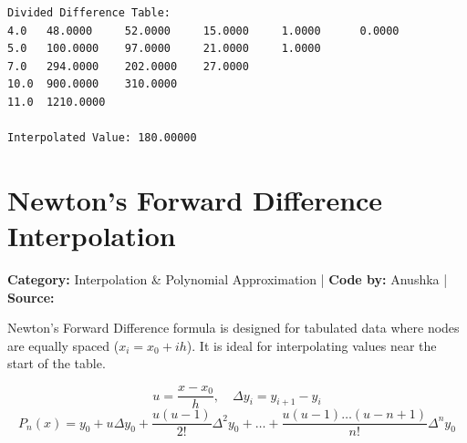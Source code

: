 \documentclass[10pt,a4paper]{report}
\begin{document}
\begin{tcolorbox}[colback=termbg,colframe=primary,title=\textbf{Program Execution Output \& Convergence Table},boxrule=1pt,arc=2mm]
\begin{lstlisting}[style=terminal_output]
Divided Difference Table:
4.0   48.0000     52.0000     15.0000     1.0000      0.0000      
5.0   100.0000    97.0000     21.0000     1.0000      
7.0   294.0000    202.0000    27.0000     
10.0  900.0000    310.0000    
11.0  1210.0000   

Interpolated Value: 180.00000
\end{lstlisting}
\end{tcolorbox}

\newpage

\section{Newton's Forward Difference Interpolation}
\textbf{Category:} \textcolor{secondary}{Interpolation \& Polynomial Approximation} \quad | \quad \textbf{Code by:} \textcolor{secondary}{Anushka} \quad | \quad \textbf{Source:} \texttt{}

Newton's Forward Difference formula is designed for tabulated data where nodes are equally spaced ($x_i = x_0 + i h$). It is ideal for interpolating values near the start of the table.

\begin{tcolorbox}[colback=theorybg,colframe=theoryframe,title=\textbf{Mathematical Theory \& Formulation},boxrule=1pt,arc=2mm]
\[
u = \frac{x - x_0}{h}, \quad \Delta y_i = y_{i+1} - y_i
\]
\[
P_n(x) = y_0 + u \Delta y_0 + \frac{u(u-1)}{2!} \Delta^2 y_0 + \dots + \frac{u(u-1)\dots(u-n+1)}{n!} \Delta^n y_0
\]
\end{tcolorbox}
\end{document}
